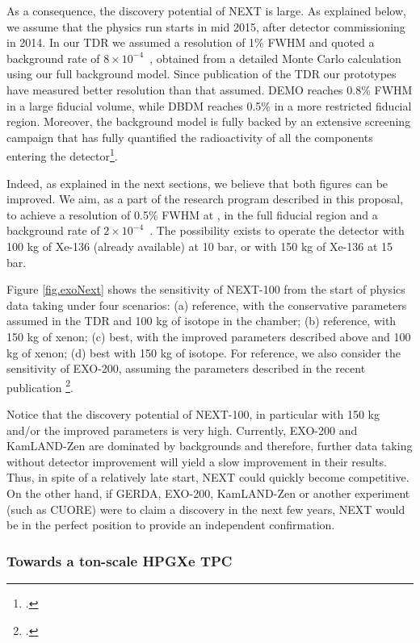 As a consequence, the discovery potential of NEXT is large. As explained below, we assume that the physics run starts in mid  2015, after detector commissioning in 2014. In our TDR we assumed a resolution of 1\% FWHM and quoted a background rate of $8 \times 10^{-4}$~\ckky, obtained from a detailed Monte Carlo calculation using our full background model. Since publication of the TDR our prototypes have measured better resolution than that assumed. DEMO reaches 0.8\% FWHM in a large fiducial volume, while DBDM reaches 0.5\% in a more restricted fiducial region. Moreover, the background model is fully backed by an extensive screening campaign that has fully quantified the radioactivity of all the components entering the detector\footcite{Alvarez:2012as}.

Indeed, as explained in the next sections, we believe that both figures can be improved. We aim, as a part of the research program described in this proposal, to achieve a resolution of 0.5\% FWHM at \Qbb, in the full fiducial region and a background rate of 
$2 \times 10^{-4}$~\ckky. The possibility exists to operate the detector with 100 kg of Xe-136 (already available) at 10 bar, or with 150 kg of Xe-136 at 15 bar.

Figure \ref{fig.exoNext} shows the sensitivity of NEXT-100 from the start of physics data taking under four scenarios: (a) reference,  with the conservative parameters assumed in the TDR and 100 kg of isotope in the chamber; (b) reference, with 150 kg of xenon; (c)  best, with the improved parameters described above and 100 kg of xenon; (d) best with  150 kg of isotope. For reference, we also consider the sensitivity of EXO-200, assuming the parameters described in the recent publication \footcite{Auger:2012ar}. 

Notice that the discovery potential of NEXT-100, in particular with 150 kg and/or the improved parameters is very high. Currently, EXO-200 and KamLAND-Zen are dominated by backgrounds and therefore, further data taking without detector improvement will yield a slow improvement in their results. Thus, in spite of a relatively late start, NEXT could quickly become competitive.  On the other hand, if GERDA, EXO-200, KamLAND-Zen
or another experiment (such as CUORE) were to claim a discovery in the next few years, NEXT would be in the perfect position to provide an independent confirmation.  

\subsubsection*{Towards a ton-scale HPGXe TPC}

